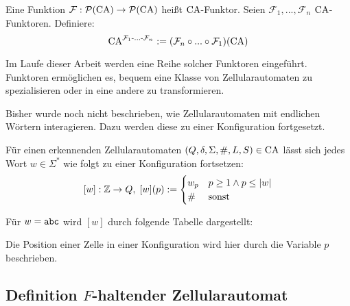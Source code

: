 \begin{definition}
    Eine Funktion $\mathcal{F}: \mathcal{P}(\textrm{CA}) \to \mathcal{P}(\textrm{CA})$ heißt $\textrm{CA}$-Funktor.
    Seien $\mathcal{F}_1, ..., \mathcal{F}_n$ $\textrm{CA}$-Funktoren. Definiere:
    \[
        \textrm{CA}^{ \mathcal{F}_1 \text{-...-} \mathcal{F}_n } := (\mathcal{F}_n \circ ... \circ \mathcal{F}_1)(\textrm{CA})
    \]
    
    Im Laufe dieser Arbeit werden eine Reihe solcher Funktoren eingeführt.
    Funktoren ermöglichen es, bequem eine Klasse von Zellularautomaten zu spezialisieren oder in eine andere zu transformieren.
\end{definition}

Bisher wurde noch nicht beschrieben, wie Zellularautomaten mit endlichen Wörtern interagieren. Dazu werden diese zu einer Konfiguration fortgesetzt.

\begin{definition}
   Für einen erkennenden Zellularautomaten $(Q, \delta, \Sigma, \#, L, S) \in \textrm{CA}$
   lässt sich jedes Wort $w \in \Sigma^*$ wie folgt zu einer Konfiguration fortsetzen:
   \[
       [w]: \mathbb{Z} \to Q, \;
       [w](p) :=
       \begin{cases} 
          w_p & p \geq 1 \land p \leq |w| \\
          \# & \text{sonst}
       \end{cases}
   \]
\end{definition}

\begin{exmp}[Konfiguration]
    Für $w = \texttt{abc}$ wird $[w]$ durch folgende Tabelle dargestellt:
    
    \begin{center}
    \end{center}
    
    Die Position einer Zelle in einer Konfiguration wird hier durch die Variable $p$ beschrieben.
\end{exmp}


\subsection{Definition \texorpdfstring{$F$}{F}-haltender Zellularautomat}

